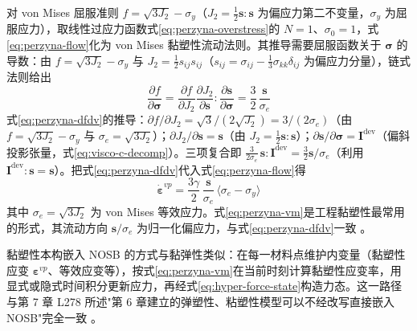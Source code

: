 对 von Mises 屈服准则 $f=\sqrt{3J_{2}}-\sigma_{y}$（$J_{2}=\tfrac{1}{2}\mathbf{s}:\mathbf{s}$ 为偏应力第二不变量，$\sigma_{y}$ 为屈服应力），取线性过应力函数式\eqref{eq:perzyna-overstress}的 $N=1$、$\sigma_{0}=1$，式\eqref{eq:perzyna-flow}化为 von Mises 黏塑性流动法则。其推导需要屈服函数关于 $\boldsymbol{\sigma}$ 的导数：由 $f=\sqrt{3J_{2}}-\sigma_{y}$ 与 $J_{2}=\tfrac{1}{2}s_{ij}s_{ij}$（$s_{ij}=\sigma_{ij}-\tfrac{1}{3}\sigma_{kk}\delta_{ij}$ 为偏应力分量），链式法则给出
\begin{equation}
  \frac{\partial f}{\partial\boldsymbol{\sigma}}
  =\frac{\partial f}{\partial J_{2}}\frac{\partial J_{2}}{\partial\mathbf{s}}:\frac{\partial\mathbf{s}}{\partial\boldsymbol{\sigma}}
  =\frac{3}{2}\,\frac{\mathbf{s}}{\sigma_{e}}
  \label{eq:perzyna-dfdv}
\end{equation}
式\eqref{eq:perzyna-dfdv}的推导：$\partial f/\partial J_{2}=\sqrt{3}/(2\sqrt{J_{2}})=3/(2\sigma_{e})$（由 $f=\sqrt{3J_{2}}-\sigma_{y}$ 与 $\sigma_{e}=\sqrt{3J_{2}}$）；$\partial J_{2}/\partial\mathbf{s}=\mathbf{s}$（由 $J_{2}=\tfrac{1}{2}\mathbf{s}:\mathbf{s}$）；$\partial\mathbf{s}/\partial\boldsymbol{\sigma}=\mathbf{I}^{\mathrm{dev}}$（偏斜投影张量，式\eqref{eq:visco-c-decomp}）。三项复合即 $\tfrac{3}{2\sigma_{e}}\,\mathbf{s}:\mathbf{I}^{\mathrm{dev}}=\tfrac{3}{2}\mathbf{s}/\sigma_{e}$（利用 $\mathbf{I}^{\mathrm{dev}}:\mathbf{s}=\mathbf{s}$）。把式\eqref{eq:perzyna-dfdv}代入式\eqref{eq:perzyna-flow}得
\begin{equation}
  \dot{\boldsymbol{\varepsilon}}^{vp}
  =\frac{3\gamma}{2}\,\frac{\mathbf{s}}{\sigma_{e}}\,\langle\sigma_{e}-\sigma_{y}\rangle
  \label{eq:perzyna-vm}
\end{equation}
其中 $\sigma_{e}=\sqrt{3J_{2}}$ 为 von Mises 等效应力。式\eqref{eq:perzyna-vm}是工程黏塑性最常用的形式，其流动方向 $\mathbf{s}/\sigma_{e}$ 为归一化偏应力，与式\eqref{eq:perzyna-dfdv}一致 \cite{Perzyna1966,Foster2010}。

黏塑性本构嵌入 NOSB 的方式与黏弹性类似：在每一材料点维护内变量（黏塑性应变 $\boldsymbol{\varepsilon}^{vp}$、等效应变等），按式\eqref{eq:perzyna-vm}在当前时刻计算黏塑性应变率，用显式或隐式时间积分更新应力，再经式\eqref{eq:hyper-force-state}构造力态。这一路径与第 7 章 L278 所述"第 6 章建立的弹塑性、粘塑性模型可以不经改写直接嵌入 NOSB"完全一致 \cite{Foster2010}。

